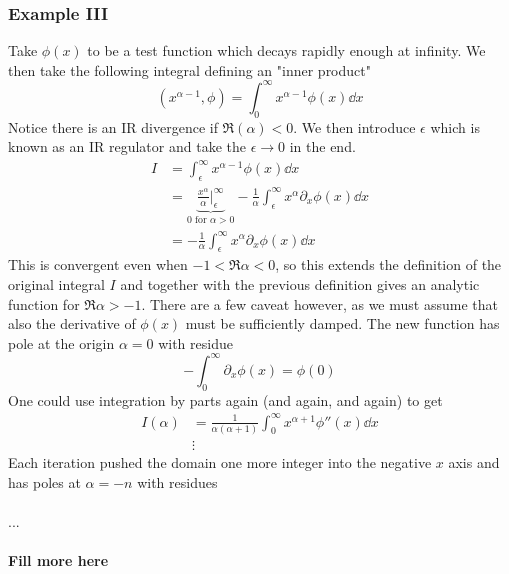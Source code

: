 \documentclass[a4paper,12pt]{article}
\begin{document}
\subsubsection{Example III}
Take $\phi(x)$ to be a test function which decays rapidly enough at infinity. We then take the following integral defining an "inner product"
\begin{equation}
(x^{\alpha-1},\phi)=\int_0^\infty x^{\alpha-1}\phi(x)\dd x
\end{equation}
Notice there is an IR divergence if $\Re(\alpha)<0$. We then introduce $\epsilon$ which is known as an IR regulator and take the $\epsilon\to 0$ in the end.
\begin{equation}
\begin{aligned}
I&=\int_\epsilon^\infty x^{\alpha-1}\phi(x)\dd x\\
&=\underbrace{\frac{x^\alpha}{\alpha}\big|^{\infty}_\epsilon}_{0 \text{ for } \alpha > 0}
-\frac{1}{\alpha}\int_\epsilon^\infty x^{\alpha}\partial_x\phi(x)\dd x\\
&=-\frac{1}{\alpha}\int_\epsilon^\infty x^{\alpha}\partial_x\phi(x)\dd x
\end{aligned}
\end{equation}
This is convergent even when $-1<\Re \alpha  <0$, so this extends the definition of the original integral $I$ and together with the previous definition gives an analytic function for $\Re \alpha >-1$. There are a few caveat however, as we must assume that also the derivative of $\phi(x)$ must be sufficiently damped. The new function has pole at the origin $\alpha=0$ with residue
\begin{equation}
-\int_0^\infty \partial_x\phi(x)=\phi(0)
\end{equation}
One could use integration by parts again (and again, and again) to get
\begin{equation}
\begin{aligned}
I(\alpha)&=\frac{1}{\alpha(\alpha+1)}\int_{0}^{\infty}x^{\alpha+1}\phi''(x)\dd x
\\
&\vdots
\end{aligned}
\end{equation}
Each iteration pushed the domain one more integer into the negative $x$ axis and has poles at $\alpha=-n$ with residues \\\\
...\\\\
\textbf{Fill more here}
\\\\
\end{document}
